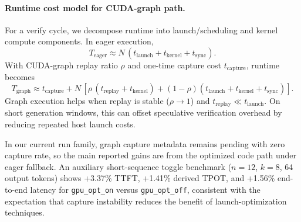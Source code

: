 \paragraph{Runtime cost model for CUDA-graph path.}
For a verify cycle, we decompose runtime into launch/scheduling and kernel
compute components. In eager execution,
\begin{equation}
T_{\text{eager}} \approx N\,(t_{\text{launch}} + t_{\text{kernel}} + t_{\text{sync}}).
\end{equation}
With CUDA-graph replay ratio $\rho$ and one-time capture cost
$t_{\text{capture}}$, runtime becomes
\begin{equation}
T_{\text{graph}} \approx t_{\text{capture}} + N\,[\rho\,(t_{\text{replay}} + t_{\text{kernel}})
+ (1-\rho)(t_{\text{launch}} + t_{\text{kernel}} + t_{\text{sync}})].
\end{equation}
Graph execution helps when replay is stable ($\rho \rightarrow 1$) and
$t_{\text{replay}} \ll t_{\text{launch}}$. On short generation windows,
this can offset speculative verification overhead by reducing repeated host
launch costs.

In our current run family, graph capture metadata remains pending with zero
capture rate, so the main reported gains are from the optimized code path
under eager fallback. An auxiliary short-sequence toggle benchmark
($n{=}12$, $k{=}8$, 64 output tokens) shows +3.37\% TTFT, +1.41\% derived TPOT,
and +1.56\% end-to-end latency for \texttt{gpu\_opt\_on} versus
\texttt{gpu\_opt\_off}, consistent with the expectation that capture instability
reduces the benefit of launch-optimization techniques.
